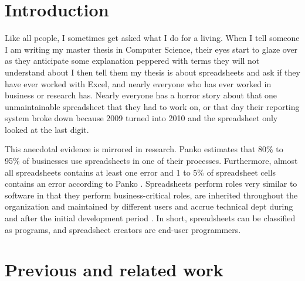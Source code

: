 \documentclass[12pt,a4paper,onecolumn,oneside]{memoir}
\begin{document}


\cleardoublepage

\tableofcontents*

\clearpage


\chapter{Introduction}

Like all people, I sometimes get asked what I do for a living.
When I tell someone I am writing my master thesis in Computer Science, their eyes start to glaze over as they anticipate some explanation peppered with terms they will not understand about 
I then tell them my thesis is about spreadsheets and ask if they have ever worked with Excel, and nearly everyone who has ever worked in business or research has.
Nearly everyone has a horror story about that one unmaintainable spreadsheet that they had to work on, or that day their reporting system broke down because 2009 turned into 2010 and the spreadsheet only looked at the last digit.

This anecdotal evidence is mirrored in research.
Panko \cite{panko2006facing} estimates that 80\% to 95\% of businesses use spreadsheets in one of their processes.
Furthermore, almost all spreadsheets contains at least one error and 1 to 5\% of spreadsheet cells contains an error according to Panko \cite{panko1998we}.
Spreadsheets perform roles very similar to software in that they perform business-critical roles, are inherited throughout the organization and maintained by different users and accrue technical dept during and after the initial development period \cite{panko1998we}.
In short, spreadsheets can be classified as programs, and spreadsheet creators are end-user programmers.



\chapter{Previous and related work}
\end{document}
